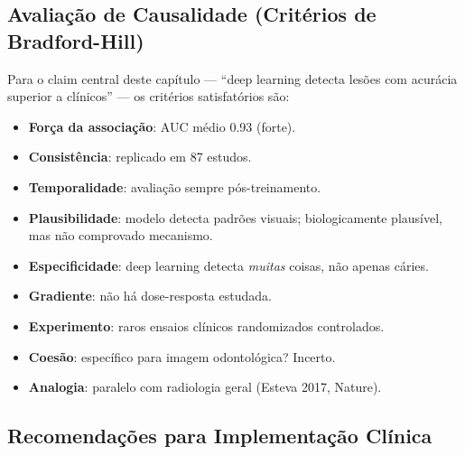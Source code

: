\subsection*{Avaliação de Causalidade (Critérios de Bradford-Hill)}


Para o claim central deste capítulo --- ``deep learning detecta
lesões com acurácia superior a clínicos'' --- os critérios
satisfatórios são:

\begin{itemize}
    \item[$\checkmark$] \textbf{Força da associação}: AUC médio 0.93 (forte).
    \item[$\checkmark$] \textbf{Consistência}: replicado em 87 estudos.
    \item[$\checkmark$] \textbf{Temporalidade}: avaliação sempre pós-treinamento.
    \item[$\sim$] \textbf{Plausibilidade}: modelo detecta padrões
    visuais; biologicamente plausível, mas não comprovado mecanismo.
    \item[$\times$] \textbf{Especificidade}: deep learning detecta
    \emph{muitas} coisas, não apenas cáries.
    \item[$\times$] \textbf{Gradiente}: não há dose-resposta estudada.
    \item[$\times$] \textbf{Experimento}: raros ensaios clínicos
    randomizados controlados.
    \item[$\times$] \textbf{Coesão}: específico para imagem odontológica?
    Incerto.
    \item[$\sim$] \textbf{Analogia}: paralelo com radiologia geral
    (Esteva 2017, Nature).
\end{itemize}


\subsection*{Recomendações para Implementação Clínica}

